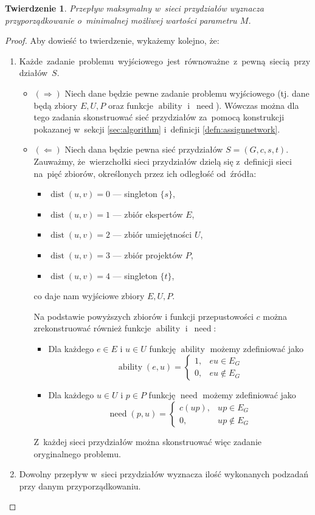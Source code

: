 \documentclass[12pt,a4paper]{article}
\newtheorem{thm}{Twierdzenie}
\theoremstyle{definition}
\DeclareMathOperator{\ability}{ability}
\DeclareMathOperator{\need}{need}
\DeclareMathOperator{\dist}{dist}
\begin{document}
\begin{thm}
Przepływ maksymalny w~sieci przydziałów wyznacza przyporządkowanie o~minimalnej
możliwej wartości parametru $M$. 
\end{thm}

\begin{proof}
Aby dowieść to twierdzenie, wykażemy kolejno, że:
\begin{enumerate}
	\item \mbox{Każde zadanie problemu wyjściowego jest równoważne z~pewną siecią
	przydziałów $S$}.
	\begin{itemize}
		\item $(\Rightarrow)$ Niech dane będzie pewne zadanie problemu
		wyjściowego (tj. dane będą zbiory $E,U,P$ oraz funkcje $\ability$
		i~$\need$). Wówczas można dla tego zadania skonstruować sieć przydziałów
		za~pomocą konstrukcji pokazanej w~sekcji \ref{sec:algorithm}
		i~definicji \ref{defn:assignnetwork}.
		\item $(\Leftarrow)$ Niech dana będzie pewna sieć przydziałów
		$S = (G,c,s,t)$. Zauważmy, że~wierzchołki sieci przydziałów dzielą się
		z~definicji sieci na~pięć zbiorów, określonych przez ich odległość
		od~źródła:
		\begin{itemize}
		\item $\dist(u,v) = 0$ --- singleton $\{s\}$,
			\item $\dist(u,v) = 1$ --- zbiór ekspertów $E$,
			\item $\dist(u,v) = 2$ --- zbiór umiejętności $U$,
			\item $\dist(u,v) = 3$ --- zbiór projektów $P$,
			\item $\dist(u,v) = 4$ --- singleton $\{t\}$,
		\end{itemize}
		co daje nam wyjściowe zbiory $E,U,P$.

		Na podstawie powyższych zbiorów i funkcji przepustowości $c$ można
		zrekonstruować również funkcje $\ability$ i~$\need$:
		\begin{itemize}
			\item Dla każdego $e \in E$ i $u \in U$ funkcję $\ability$ możemy
			zdefiniować jako
			$$ \ability(e, u) = \begin{cases}
				1, & eu \in E_G \\
				0, & eu \notin E_G
			\end{cases} $$
			\item Dla każdego $u \in U$ i $p \in P$ funkcję $\need$ możemy
			zdefiniować jako
			$$ \need(p, u) = \begin{cases}
				c(up), & up \in E_G \\
				0, & up \notin E_G
			\end{cases} $$
		\end{itemize}
		Z~każdej sieci przydziałów można skonstruować więc zadanie oryginalnego
		problemu. 
	\end{itemize}
	\item Dowolny przepływ w~sieci przydziałów wyznacza ilość wykonanych
	podzadań przy danym przyporządkowaniu.
	

\end{enumerate}
\end{proof}
\end{document}
